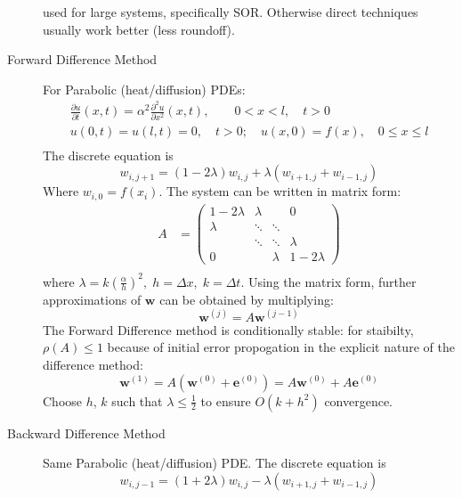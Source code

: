 \documentclass[8pt]{article}
\begin{document}
\begin{multicols}{2}
\begin{description}
    used for large systems, specifically SOR.
    Otherwise direct techniques usually work better (less roundoff).
    \pagebreak[4]
  \item[Forward Difference Method] For Parabolic (heat/diffusion) PDEs:
    \begin{equation*}
      \begin{aligned}
        &\frac{\partial u}{\partial t}(x,t) =
        \alpha^2\frac{\partial^2u}{\partial x^2}(x,t), \qquad
        0<x<l,\quad t>0& \\
        &u(0,t)=u(l,t)=0,\quad t>0; \quad u(x,0)=f(x),\quad 0\leq x\leq
        l& \\
      \end{aligned}
    \end{equation*}
    The discrete equation is
    $$w_{i,j+1}=(1-2\lambda)w_{i,j}+\lambda(w_{i+1,j}+w_{i-1,j})$$
    Where $w_{i,0}=f(x_i)$. The system can be written in
    matrix form:
    \begin{equation*}
      \begin{aligned}
        A&=
        \begin{pmatrix}
            1-2\lambda & \lambda & & 0\\
            \lambda& \ddots & \ddots & \\
            & \ddots & \ddots & \lambda\\
            0 & & \lambda & 1-2\lambda
          \end{pmatrix} \\
      \end{aligned}
    \end{equation*}
    where $\lambda = k\left(\frac{\alpha}{h}\right)^2,\;h=\Delta
    x,\;k=\Delta t$. Using the matrix form, further approximations of
    $\mathbf{w}$ can be obtained by multiplying:
    $$ \mathbf{w}^{(j)} = A\mathbf{w}^{(j-1)} $$
    The Forward Difference method is conditionally stable: for
    staibilty, $\rho(A)\leq1$ because of initial error propogation in
    the explicit nature of the difference method:
    $$\mathbf{w}^{(1)}=A(\mathbf{w}^{(0)}+\mathbf{e}^{(0)}) =
    A\mathbf{w}^{(0)} + A\mathbf{e}^{(0)}$$
    Choose $h$, $k$ such that $\lambda\leq\frac{1}{2}$ to ensure
    $O(k+h^2)$ convergence.
  \item[Backward Difference Method] Same Parabolic (heat/diffusion)
    PDE. The discrete equation is
    $$w_{i,j-1}=(1+2\lambda)w_{i,j}-\lambda(w_{i+1,j}+w_{i-1,j})$$

\end{description}
\end{multicols}
\end{document}

